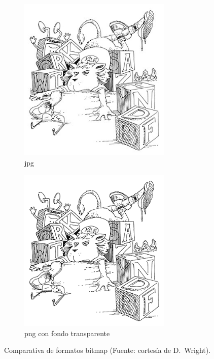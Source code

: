 \documentclass[11pt,a4paper]{article}
\begin{document}
\begin{figure}[H]
	\centering
  	\begin{subfigure}[b]{0.4\textwidth}
  		\centering
		\includegraphics[width=0.8\textwidth]{lionL.jpg}
		\caption{jpg}\label{fig:lionLjpg}
  	\end{subfigure}
  	\begin{subfigure}[b]{0.4\textwidth}
  		\centering
		\includegraphics[width=0.8\textwidth]{lionL.png}
		\caption{png con fondo transparente}\label{fig:lionpng}
  	\end{subfigure}
  	\caption[Comparación jpg y png con transparencia]{Comparativa de formatos bitmap (Fuente: cortesía de D.~Wright).}
	\label{fig:lion}
\end{figure}
\end{document}
